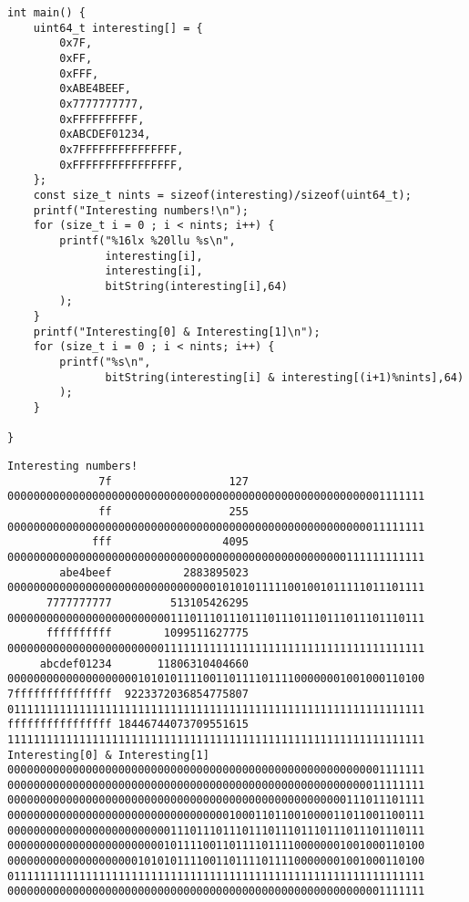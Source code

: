 \documentclass[11pt]{article}
\begin{document}
\begin{enumerate}
\begin{enumerate}
\begin{verbatim}
int main() {
    uint64_t interesting[] = {
        0x7F,
        0xFF,
        0xFFF,
        0xABE4BEEF,
        0x7777777777,
        0xFFFFFFFFFF,
        0xABCDEF01234,
        0x7FFFFFFFFFFFFFFF,
        0xFFFFFFFFFFFFFFFF,
    };
    const size_t nints = sizeof(interesting)/sizeof(uint64_t);
    printf("Interesting numbers!\n");
    for (size_t i = 0 ; i < nints; i++) {
        printf("%16lx %20llu %s\n",
               interesting[i],
               interesting[i],
               bitString(interesting[i],64)
        );
    }
    printf("Interesting[0] & Interesting[1]\n");
    for (size_t i = 0 ; i < nints; i++) {
        printf("%s\n",
               bitString(interesting[i] & interesting[(i+1)%nints],64)
        );
    }

}

\end{verbatim}

\begin{verbatim}
Interesting numbers!
              7f                  127 0000000000000000000000000000000000000000000000000000000001111111
              ff                  255 0000000000000000000000000000000000000000000000000000000011111111
             fff                 4095 0000000000000000000000000000000000000000000000000000111111111111
        abe4beef           2883895023 0000000000000000000000000000000010101011111001001011111011101111
      7777777777         513105426295 0000000000000000000000000111011101110111011101110111011101110111
      ffffffffff        1099511627775 0000000000000000000000001111111111111111111111111111111111111111
     abcdef01234       11806310404660 0000000000000000000010101011110011011110111100000001001000110100
7fffffffffffffff  9223372036854775807 0111111111111111111111111111111111111111111111111111111111111111
ffffffffffffffff 18446744073709551615 1111111111111111111111111111111111111111111111111111111111111111
Interesting[0] & Interesting[1]
0000000000000000000000000000000000000000000000000000000001111111
0000000000000000000000000000000000000000000000000000000011111111
0000000000000000000000000000000000000000000000000000111011101111
0000000000000000000000000000000000100011011001000011011001100111
0000000000000000000000000111011101110111011101110111011101110111
0000000000000000000000001011110011011110111100000001001000110100
0000000000000000000010101011110011011110111100000001001000110100
0111111111111111111111111111111111111111111111111111111111111111
0000000000000000000000000000000000000000000000000000000001111111
\end{verbatim}
\end{enumerate}
\end{enumerate}
\end{document}
